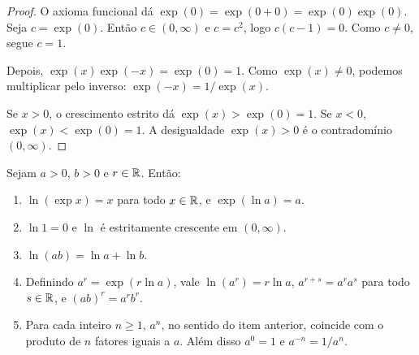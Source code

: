 \documentclass[11pt,a4paper]{article}
\begin{document}
\begin{proof}
O axioma funcional dá $\exp(0)=\exp(0+0)=\exp(0)\exp(0)$. Seja $c=\exp(0)$. Então $c\in(0,\infty)$ e $c=c^2$, logo $c(c-1)=0$. Como $c\neq 0$, segue $c=1$.

Depois, $\exp(x)\exp(-x)=\exp(0)=1$. Como $\exp(x)\neq 0$, podemos multiplicar pelo inverso: $\exp(-x)=1/\exp(x)$.

Se $x>0$, o crescimento estrito dá $\exp(x)>\exp(0)=1$. Se $x<0$, $\exp(x)<\exp(0)=1$. A desigualdade $\exp(x)>0$ é o contradomínio $(0,\infty)$.
\end{proof}

\begin{teorema}\label{teo:log}
Sejam $a>0$, $b>0$ e $r\in\mathbb{R}$. Então:
\begin{enumerate}
\item $\ln(\exp x)=x$ para todo $x\in\mathbb{R}$, e $\exp(\ln a)=a$.
\item $\ln 1=0$ e $\ln$ é estritamente crescente em $(0,\infty)$.
\item $\ln(ab)=\ln a+\ln b$.
\item Definindo $a^r=\exp(r\ln a)$, vale $\ln(a^r)=r\ln a$, $a^{r+s}=a^ra^s$ para todo $s\in\mathbb{R}$, e $(ab)^r=a^rb^r$.
\item Para cada inteiro $n\ge 1$, $a^n$, no sentido do item anterior, coincide com o produto de $n$ fatores iguais a $a$. Além disso $a^0=1$ e $a^{-n}=1/a^n$.
\end{enumerate}
\end{teorema}
\end{document}
